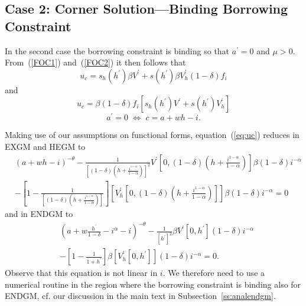 \documentclass[a4paper,12pt]{article}%
\begin{document}
\subsection*{Case 2: Corner Solution---Binding Borrowing Constraint}

In the second case the borrowing constraint is binding so that $a^{\prime}=0$ and $\mu>0$. From~(\ref{FOC1}) and~(\ref{FOC2}) it then follows that
\begin{equation}
u_{c}=s_{h}\left(  h^{\prime}\right)  \beta V^{\prime}+s\left(  h^{\prime}\right)  \beta V_{h}^{\prime}\left(  1-\delta\right)  f_{i} \label{eq:uc}
\end{equation}
and
\[
u_{c}=\beta\left(  1-\delta\right)  f_{i}\left[  s_{h}\left(  h^{\prime}\right)  V^{\prime}+s\left(  h^{\prime}\right)  V_{h}^{\prime}\right]
\]
\[
a^{\prime}=0\;\Leftrightarrow\;c=a+wh-i.
\]

Making use of our assumptions on functional forms, equation~(\ref{eq:uc}) reduces in EXGM and HEGM to
\begin{align*}
& \left(  a+wh-i\right)  ^{-\theta}-\frac{1}{\left[  \left(  1-\delta\right)\left(  h+\frac{i^{1-\alpha}}{1-\alpha}\right)  \right]  ^{2}}V^{\prime}\left[  0,\left(  1-\delta\right)  \left(  h+\frac{i^{1-\alpha}}{1-\alpha}\right)  \right]  \beta\left(  1-\delta\right)  i^{-\alpha} \\
&  -\left[  1-\frac{1}{\left[  \left(  1-\delta\right)  \left(  h+\frac{i^{1-\alpha}}{1-\alpha}\right)  \right]  }\right]  \left[  V_{h}^{\prime}\left[  0,\left(  1-\delta\right)  \left(  h+\frac{i^{1-\alpha}}{1-\alpha}\right)  \right]  \right]  \beta\left(  1-\delta\right)  i^{-\alpha}=0
\end{align*}
and in ENDGM to
\begin{align*}
&  \left(  a+w\frac{h^{\prime}}{1-\delta}-i^{\alpha}-i\right)  ^{-\theta}-\frac{1}{\left[  h^{\prime}\right]  ^{2}}\beta V^{\prime}\left[0,h^{\prime}\right]  \left(  1-\delta\right)  i^{-\alpha}\\
&  -\left[  1-\frac{1}{1+h^{\prime}}\right]  \beta\left[  V_{h}^{\prime}\left[  0,h^{\prime}\right]  \right]  \left(  1-\delta\right)  i^{-\alpha}=0.
\end{align*}
Observe that this equation is not linear in $i$. We therefore need to use a numerical routine in the region where the borrowing constraint is binding also for ENDGM, cf. our discussion in the main text in Subsection~\ref{ss:analendgm}.

\qquad
\end{document}
